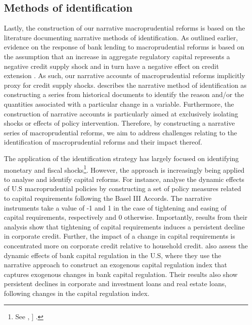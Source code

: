 \documentclass[
  letterpaper,
  DIV=11,
  numbers=noendperiod]{scrartcl}
\begin{document}
\subsection{Methods of identification}\label{methods-of-identification}

Lastly, the construction of our narrative macroprudential reforms is
based on the literature documenting narrative methods of identification.
As outlined earlier, evidence on the response of bank lending to
macroprudential reforms is based on the assumption that an increase in
aggregate regulatory capital represents a negative credit supply shock
and in turn have a negative effect on credit extension
\citep{noss2016estimating}. As such, our narrative accounts of
macroprudential reforms implicitly proxy for credit supply shocks.
\cite{ramey2016macroeconomic} describes the narrative method of
identification as constructing a series from historical documents to
identify the reason and/or the quantities associated with a particular
change in a variable. Furthermore, the construction of narrative
accounts is particularly aimed at exclusively isolating shocks or
effects of policy intervention\citep{angelopoulou2007narrative}.
Therefore, by constructing a narrative series of macroprudential
reforms, we aim to address challenges relating to the identification of
macroprudential reforms and their impact thereof.

The application of the identification strategy has largely focused on
identifying monetary and fiscal
shocks\footnote{See \cite{romer1989does}, \cite{romer1997identification} \cite{romer2004new} \cite{romer2010macroeconomic} \cite{ramey2011identifying} ]\cite{ramey2016macroeconomic} \cite{ramey2018government}.}.
However, the approach is increasingly being applied to analyse and
identify capital reforms. For instance, \cite{budnik2020identifying}
analyse the dynamic effects of U.S macroprudential policies by
constructing a set of policy measures related to capital requirements
following the Basel III Accords. The narrative instruments take a value
of -1 and 1 in the case of tightening and easing of capital
requirements, respectively and 0 otherwise. Importantly, results from
their analysis show that tightening of capital requirements induces a
persistent decline in corporate credit. Further, the impact of a change
in capital requirements is concentrated more on corporate credit
relative to household credit. \cite{eickmeier2018macroeconomic} also
assess the dynamic effects of bank capital regulation in the U.S, where
they use the narrative approach to construct an exogenous capital
regulation index that captures exogenous changes in bank capital
regulation. Their results also show persistent declines in corporate and
investment loans and real estate loans, following changes in the capital
regulation index.
\end{document}
